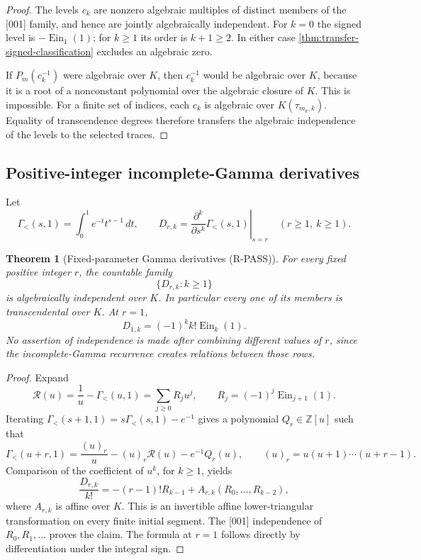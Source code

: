 \documentclass[11pt]{article}
\theoremstyle{keio}
\newtheorem{theorem}{Theorem}[section]
\theoremstyle{definition}
\theoremstyle{remark}
\newcommand{\Z}{\mathbb Z}
\newcommand{\Ein}{\operatorname{Ein}}
\newcommand{\RPASS}{\textcolor{keioxblue}{\textsf{R-PASS}}}
\begin{document}
\begin{proof}
The levels \(c_k\) are nonzero algebraic multiples of distinct members of
the [001] family, and hence are jointly algebraically independent.  For
\(k=0\) the signed level is \(-\Ein_1(1)\); for \(k\ge1\) its order is
\(k+1\ge2\).  In either case
\cref{thm:transfer-signed-classification} excludes an algebraic zero.

If \(P_m(c_k^{-1})\) were algebraic over \(K\), then \(c_k^{-1}\) would
be algebraic over \(K\), because it is a root of a nonconstant polynomial
over the algebraic closure of \(K\).  This is impossible.  For a finite
set of indices, each \(c_k\) is algebraic over
\(K(\tau_{m_k,k})\).  Equality of transcendence degrees therefore transfers
the algebraic independence of the levels to the selected traces.
\end{proof}

\subsection{Positive-integer incomplete-Gamma derivatives}

Let
\[
 \Gamma_{<}(s,1)=\int_0^1e^{-t}t^{s-1}\,dt,
 \qquad
 D_{r,k}=\left.\frac{\partial^k}{\partial s^k}
 \Gamma_{<}(s,1)\right|_{s=r}
 \quad(r\ge1,\ k\ge1).
\]

\begin{theorem}[Fixed-parameter Gamma derivatives (\RPASS)]
\label{thm:transfer-incomplete-gamma-derivatives}
For every fixed positive integer \(r\), the countable family
\[
 \{D_{r,k}:k\ge1\}
\]
is algebraically independent over \(K\).  In particular every one of its
members is transcendental over \(K\).  At \(r=1\),
\[
 D_{1,k}=(-1)^k k!\Ein_k(1).
\]
No assertion of independence is made after combining different values of
\(r\), since the incomplete-Gamma recurrence creates relations between
those rows.
\end{theorem}

\begin{proof}
Expand
\[
 \mathscr R(u)=\frac1u-\Gamma_{<}(u,1)
 =\sum_{j\ge0}R_ju^j,
 \qquad R_j=(-1)^j\Ein_{j+1}(1).
\]
Iterating
\(\Gamma_{<}(s+1,1)=s\Gamma_{<}(s,1)-e^{-1}\) gives a polynomial
\(Q_r\in\Z[u]\) such that
\[
 \Gamma_{<}(u+r,1)
 =\frac{(u)_r}{u}-(u)_r\mathscr R(u)-e^{-1}Q_r(u),
 \qquad
 (u)_r=u(u+1)\cdots(u+r-1).
\]
Comparison of the coefficient of \(u^k\), for \(k\ge1\), yields
\[
 \frac{D_{r,k}}{k!}
 =-(r-1)!R_{k-1}
 +A_{r,k}(R_0,\ldots,R_{k-2}),
\]
where \(A_{r,k}\) is affine over \(K\).  This is an invertible affine
lower-triangular transformation on every finite initial segment.  The [001]
independence of \(R_0,R_1,\ldots\) proves the claim.  The formula at
\(r=1\) follows directly by differentiation under the integral sign.
\end{proof}
\end{document}
